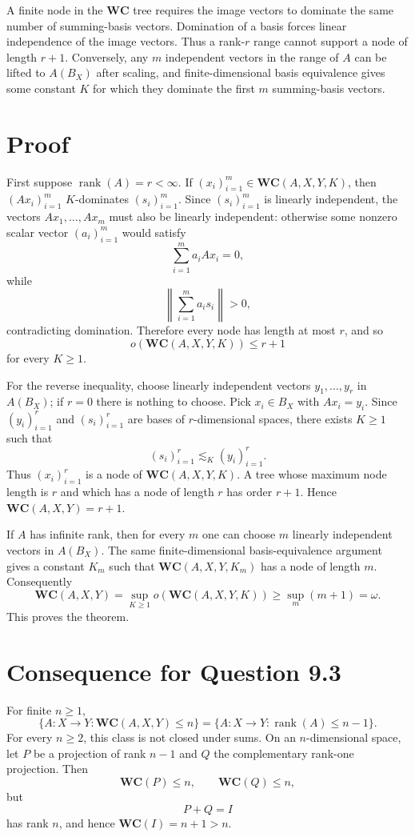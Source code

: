 \documentclass[11pt]{article}
\begin{document}
A finite node in the $\mathbf{WC}$ tree requires the image vectors to dominate
the same number of summing-basis vectors.  Domination of a basis forces linear
independence of the image vectors.  Thus a rank-$r$ range cannot support a
node of length $r+1$.  Conversely, any $m$ independent vectors in the range of
$A$ can be lifted to $A(B_X)$ after scaling, and finite-dimensional basis
equivalence gives some constant $K$ for which they dominate the first $m$
summing-basis vectors.

\section*{Proof}

First suppose $\operatorname{rank}(A)=r<\infty$.  If
$(x_i)_{i=1}^m\in \mathbf{WC}(A,X,Y,K)$, then
$(Ax_i)_{i=1}^m$ $K$-dominates $(s_i)_{i=1}^m$.  Since
$(s_i)_{i=1}^m$ is linearly independent, the vectors
$Ax_1,\ldots,Ax_m$ must also be linearly independent: otherwise some
nonzero scalar vector $(a_i)_{i=1}^m$ would satisfy
\[
  \sum_{i=1}^m a_i Ax_i=0,
\]
while
\[
  \left\|\sum_{i=1}^m a_i s_i\right\|>0,
\]
contradicting domination.  Therefore every node has length at most $r$, and
so
\[
  o(\mathbf{WC}(A,X,Y,K))\leq r+1
\]
for every $K\geq1$.

For the reverse inequality, choose linearly independent vectors
$y_1,\ldots,y_r$ in $A(B_X)$; if $r=0$ there is nothing to choose.  Pick
$x_i\in B_X$ with $Ax_i=y_i$.  Since $(y_i)_{i=1}^r$ and
$(s_i)_{i=1}^r$ are bases of $r$-dimensional spaces, there exists
$K\geq1$ such that
\[
  (s_i)_{i=1}^r \lesssim_K (y_i)_{i=1}^r.
\]
Thus $(x_i)_{i=1}^r$ is a node of $\mathbf{WC}(A,X,Y,K)$.  A tree whose
maximum node length is $r$ and which has a node of length $r$ has order
$r+1$.  Hence $\mathbf{WC}(A,X,Y)=r+1$.

If $A$ has infinite rank, then for every $m$ one can choose
$m$ linearly independent vectors in $A(B_X)$.  The same finite-dimensional
basis-equivalence argument gives a constant $K_m$ such that
$\mathbf{WC}(A,X,Y,K_m)$ has a node of length $m$.  Consequently
\[
  \mathbf{WC}(A,X,Y)
  =\sup_{K\geq1}o(\mathbf{WC}(A,X,Y,K))
  \geq \sup_m (m+1)
  =\omega.
\]
This proves the theorem.

\section*{Consequence for Question 9.3}

For finite $n\geq1$,
\[
  \{A:X\to Y:\mathbf{WC}(A,X,Y)\leq n\}
  =
  \{A:X\to Y:\operatorname{rank}(A)\leq n-1\}.
\]
For every $n\geq2$, this class is not closed under sums.  On an
$n$-dimensional space, let $P$ be a projection of rank $n-1$ and $Q$ the
complementary rank-one projection.  Then
\[
  \mathbf{WC}(P)\leq n,\qquad \mathbf{WC}(Q)\leq n,
\]
but
\[
  P+Q=I
\]
has rank $n$, and hence $\mathbf{WC}(I)=n+1>n$.
\end{document}
